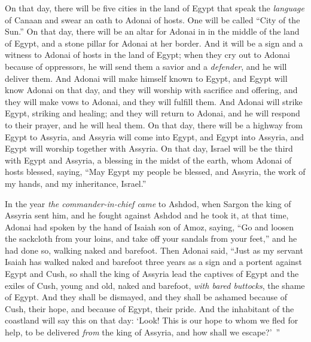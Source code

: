 \begin{biblechapter}
\verse On that day, there will be five cities in the land of Egypt that speak the \textit{language} of Canaan and swear an oath to Adonai of hosts. One will be called “City of the Sun.”
\verse On that day, there will be an altar for Adonai in in the middle of the land of Egypt, and a stone pillar for Adonai at her border.
\verse And it will be a sign and a witness to Adonai of hosts in the land of Egypt; when they cry out to Adonai because of oppressors, he will send them a savior and a \textit{defender}, and he will deliver them.
\verse And Adonai will make himself known to Egypt, and Egypt will know Adonai on that day, and they will worship with sacrifice and offering, and they will make vows to Adonai, and they will fulfill them.
\verse And Adonai will strike Egypt, striking and healing; and they will return to Adonai, and he will respond to their prayer, and he will heal them.
\verse On that day, there will be a highway from Egypt to Assyria, and Assyria will come into Egypt, and Egypt into Assyria, and Egypt will worship together with Assyria.
\verse On that day, Israel will be the third with Egypt and Assyria, a blessing in the midst of the earth,
\verse whom Adonai of hosts blessed, saying, “May Egypt my people be blessed, and Assyria, the work of my hands, and my inheritance, Israel.”
\end{biblechapter}

\begin{biblechapter} %
 In the year \textit{the commander-in-chief came} to Ashdod, when Sargon the king of Assyria sent him, and he fought against Ashdod and he took it,
\verse at that time, Adonai had spoken by the hand of Isaiah son of Amoz, saying, “Go and loosen the sackcloth from your loins, 
and take off your sandals from your feet,” and he had done so, walking naked and barefoot.
\verse Then Adonai said, “Just as my servant Isaiah has walked naked and barefoot three years as a sign and a portent against Egypt and Cush,
\verse so shall the king of Assyria lead the captives of Egypt and the exiles of Cush, young and old, naked and barefoot, \textit{with bared buttocks}, the shame of Egypt.
\verse And they shall be dismayed, 
and they shall be ashamed 
because of Cush, their hope, 
and because of Egypt, their pride.
\verse And the inhabitant of the coastland will say this on that day: ‘Look! This is our hope to whom we fled for help, to be delivered \textit{from} the king of Assyria, and how shall we escape?’ ”
\end{biblechapter}

